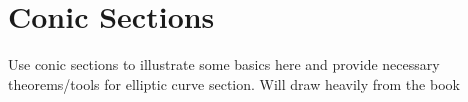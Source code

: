 \section{Conic Sections}

Use conic sections to illustrate some basics here
and provide necessary theorems/tools for elliptic curve
section. Will draw heavily from the book
